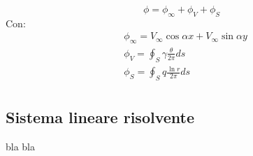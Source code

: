 \begin{equation}
  \phi = \phi_\infty + \phi_V + \phi_S
\end{equation}
Con:
\begin{equation}
 \begin{aligned}
  & \phi_\infty = V_\infty \cos{\alpha} x + V_\infty \sin{\alpha} y \\
  & \phi_V =  \oint_{S} \gamma \frac{\theta}{2 \pi} ds \\
  & \phi_S =  \oint_{S} q \frac{\ln{r}}{2 \pi} ds \\
 \end{aligned}
\end{equation}

\subsection{Sistema lineare risolvente}

bla bla


